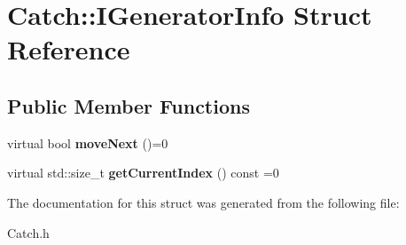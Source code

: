\hypertarget{struct_catch_1_1_i_generator_info}{\section{Catch\-:\-:I\-Generator\-Info Struct Reference}
\label{struct_catch_1_1_i_generator_info}
}
\subsection*{Public Member Functions}
\begin{DoxyCompactItemize}
\item 
\hypertarget{struct_catch_1_1_i_generator_info_a2b86711ca7009903edfe27ed62b515ef}{virtual bool {\bfseries move\-Next} ()=0}\label{struct_catch_1_1_i_generator_info_a2b86711ca7009903edfe27ed62b515ef}

\item 
\hypertarget{struct_catch_1_1_i_generator_info_a6a0dca712d31f6849fd9447b1344673a}{virtual std\-::size\-\_\-t {\bfseries get\-Current\-Index} () const =0}\label{struct_catch_1_1_i_generator_info_a6a0dca712d31f6849fd9447b1344673a}

\end{DoxyCompactItemize}


The documentation for this struct was generated from the following file\-:\begin{DoxyCompactItemize}
\item 
Catch.\-h\end{DoxyCompactItemize}
